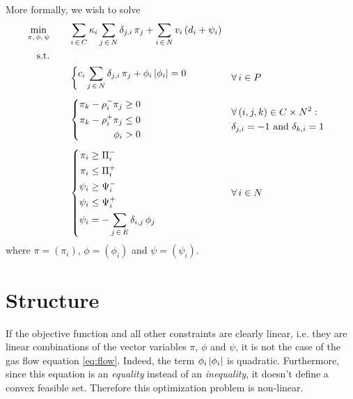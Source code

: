 \documentclass[a4paper, 12pt]{article}
\begin{document}
More formally, we wish to solve
\begin{equation}\label{eq:system}
    \begin{aligned}
        \min_{\pi, \, \phi, \, \psi} && \quad &  \sum_{i \, \in \, C} \kappa_i \sum_{j \, \in \, N} \delta_{j, i} \, \pi_j + \sum_{i \, \in \, N} v_i \left(d_i + \psi_i\right) \\
        \text{s.t.} &&& \\
        &&&
        \left\{\begin{aligned}
            c_i \sum_{j \, \in \, N} \delta_{j, i} \, \pi_j + \phi_i \left|\phi_i\right| = 0
        \end{aligned}\right. && \forall \, i \in P \\[0.5em]
        &&&
        \left\{\begin{aligned}
            \pi_k - \rho^-_i \pi_j & \geq 0 \\
            \pi_k - \rho^+_i \pi_j & \leq 0 \\
            \phi_i & > 0
        \end{aligned}\right. && 
        \begin{aligned}
            & \forall \, (i, j, k) \in C \times N^2 : \\
            & \delta_{j, i} = -1 \text{ and } \delta_{k, i} = 1
        \end{aligned} \\[0.5em]
        &&&
        \left\{\begin{aligned}
            \pi_i & \geq \Pi^-_i \\
            \pi_i & \leq \Pi^+_i \\
            \psi_i & \geq \Psi_i^- \\
            \psi_i & \leq \Psi_i^+ \\
            \psi_i & = -\sum_{j \, \in \, E} \delta_{i, j} \, \phi_j
        \end{aligned}\right. && \forall \, i \in N
    \end{aligned}
\end{equation}
where $\pi = (\pi_i)$, $\phi = (\phi_i)$ and $\psi = (\psi_i)$.

\section{Structure}

If the objective function and all other constraints are clearly linear, i.e. they are linear combinations of the vector variables $\pi$, $\phi$ and $\psi$, it is not the case of the gas flow equation \ref{eq:flow}. Indeed, the term $\phi_i \left|\phi_i\right|$ is quadratic. Furthermore, since this equation is an \emph{equality} instead of an \emph{inequality}, it doesn't define a convex feasible set. Therefore this optimization problem is non-linear.
\end{document}
